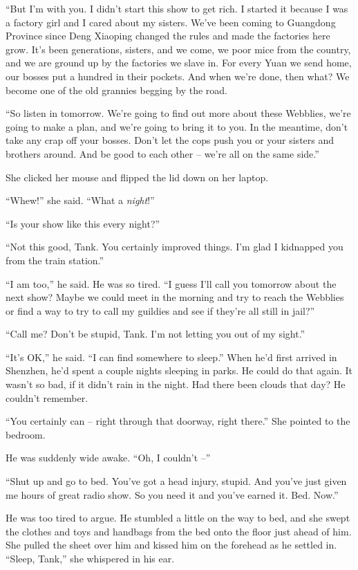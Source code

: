 ``But I'm with you. I didn't start this show to get rich. I started
it because I was a factory girl and I cared about my sisters. We've
been coming to Guangdong Province since Deng Xiaoping changed the
rules and made the factories here grow. It's been generations,
sisters, and we come, we poor mice from the country, and we are
ground up by the factories we slave in. For every Yuan we send
home, our bosses put a hundred in their pockets. And when we're
done, then what? We become one of the old grannies begging by the
road.

``So listen in tomorrow. We're going to find out more about these
Webblies, we're going to make a plan, and we're going to bring it
to you. In the meantime, don't take any crap off your bosses. Don't
let the cops push you or your sisters and brothers around. And be
good to each other -- we're all on the same side.''

She clicked her mouse and flipped the lid down on her laptop.

``Whew!'' she said. ``What a \emph{night}!''

``Is your show like this every night?''

``Not this good, Tank. You certainly improved things. I'm glad I
kidnapped you from the train station.''

``I am too,'' he said. He was so tired. ``I guess I'll call you
tomorrow about the next show? Maybe we could meet in the morning
and try to reach the Webblies or find a way to try to call my
guildies and see if they're all still in jail?''

``Call me? Don't be stupid, Tank. I'm not letting you out of my
sight.''

``It's OK,'' he said. ``I can find somewhere to sleep.'' When he'd
first arrived in Shenzhen, he'd spent a couple nights sleeping in
parks. He could do that again. It wasn't so bad, if it didn't rain
in the night. Had there been clouds that day? He couldn't
remember.

``You certainly can -- right through that doorway, right there.'' She
pointed to the bedroom.

He was suddenly wide awake. ``Oh, I couldn't --''

``Shut up and go to bed. You've got a head injury, stupid. And
you've just given me hours of great radio show. So you need it and
you've earned it. Bed. Now.''

He was too tired to argue. He stumbled a little on the way to bed,
and she swept the clothes and toys and handbags from the bed onto
the floor just ahead of him. She pulled the sheet over him and
kissed him on the forehead as he settled in. ``Sleep, Tank,'' she
whispered in his ear.

